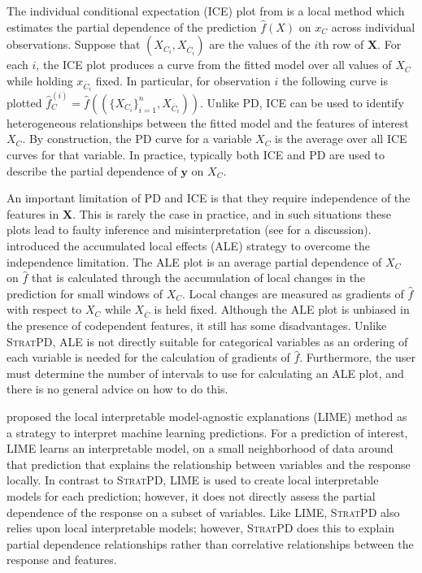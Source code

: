 \documentclass[12pt]{article}
\newcommand{\spd}{\fontfamily{cmr}\textsc{\small StratPD}}
\begin{document}
The individual conditional expectation (ICE) plot from \cite{ICE} is a local method which estimates the partial dependence of the prediction $\widehat{f}({X})$ on $x_C$ across individual observations. Suppose that $(X_{C_i}, X_{\overline{C}_i})$ are the values of the $i$th row of $\mathbf{X}$. For each $i$, the ICE plot produces a curve from the fitted model over all values of $X_C$ while holding $x_{\overline{C}_i}$ fixed. In particular, for observation $i$ the following curve is plotted $\widehat{f}^{(i)}_C = \widehat{f}((\{X_{C_i}\}_{i = 1}^n, X_{\overline{C}_i}))$. Unlike PD, ICE can be used to  identify heterogeneous relationships between the fitted model and the features of interest $X_C$. By construction, the PD curve for a variable $X_C$ is the average over all ICE curves for that variable. In practice, typically both ICE and PD are used to describe the partial dependence of $\mathbf{y}$ on $X_C$.

An important limitation of PD and ICE is that they require independence of the features in $\mathbf{X}$. This is rarely the case in practice, and in such situations these plots lead to faulty inference and misinterpretation (see \cite{apley2016visualizing} for a discussion). \cite{apley2016visualizing} introduced the accumulated local effects (ALE) strategy to overcome the independence limitation. The ALE plot is an average partial dependence of $X_C$ on $\widehat{f}$ that is calculated through the accumulation of local changes in the prediction for small windows of $X_C$. Local changes are measured as gradients of $\widehat{f}$ with respect to $X_C$ while $X_{\overline{C}}$ is held fixed. Although the ALE plot is unbiased in the presence of codependent features, it still has some disadvantages. Unlike \spd{}, ALE is not directly suitable for categorical variables as an ordering of each variable is needed for the calculation of gradients of $\widehat{f}$. Furthermore, the user must determine the number of intervals to use for calculating an ALE plot, and there is no general advice on how to do this.

\cite{ribeiro2016should} proposed the local interpretable model-agnostic explanations (LIME) method as a strategy to interpret machine learning predictions. For a prediction of interest, LIME learns an interpretable model, on a small neighborhood of data around that prediction that explains the relationship between variables and the response locally. In contrast to \spd{}, LIME is used to create local interpretable models for each prediction; however, it does not directly assess the partial dependence of the response on a subset of variables. Like LIME, \spd{} also relies upon local interpretable models; however, \spd{} does this to explain partial dependence relationships rather than correlative relationships between the response and features. 
\end{document}
